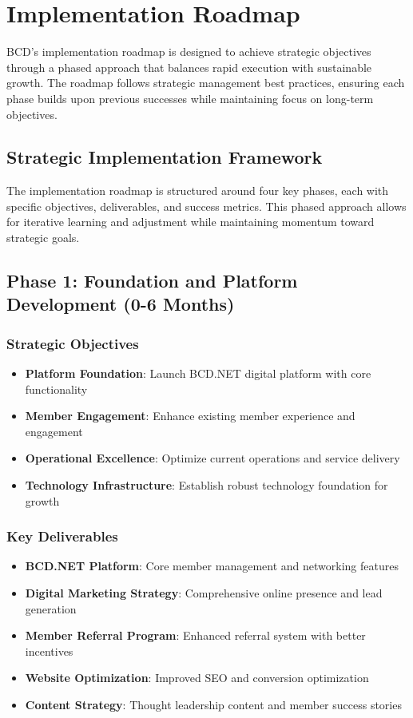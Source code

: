 \section{Implementation Roadmap}

BCD's implementation roadmap is designed to achieve strategic objectives through a phased approach that balances rapid execution with sustainable growth. The roadmap follows strategic management best practices, ensuring each phase builds upon previous successes while maintaining focus on long-term objectives.

\subsection{Strategic Implementation Framework}

The implementation roadmap is structured around four key phases, each with specific objectives, deliverables, and success metrics. This phased approach allows for iterative learning and adjustment while maintaining momentum toward strategic goals.

\subsection{Phase 1: Foundation and Platform Development (0-6 Months)}

\subsubsection{Strategic Objectives}
\begin{itemize}
    \item \textbf{Platform Foundation}: Launch BCD.NET digital platform with core functionality
    \item \textbf{Member Engagement}: Enhance existing member experience and engagement
    \item \textbf{Operational Excellence}: Optimize current operations and service delivery
    \item \textbf{Technology Infrastructure}: Establish robust technology foundation for growth
\end{itemize}

\subsubsection{Key Deliverables}
\begin{itemize}
    \item \textbf{BCD.NET Platform}: Core member management and networking features
    \item \textbf{Digital Marketing Strategy}: Comprehensive online presence and lead generation
    \item \textbf{Member Referral Program}: Enhanced referral system with better incentives
    \item \textbf{Website Optimization}: Improved SEO and conversion optimization
    \item \textbf{Content Strategy}: Thought leadership content and member success stories
\end{itemize}

